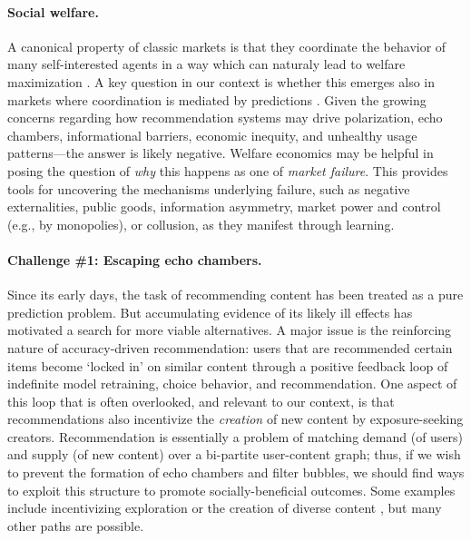 \paragraph{Social welfare.}
A canonical property of classic markets is that they coordinate the behavior of many self-interested agents in a way which can naturaly lead to welfare maximization \citep[e.g.,][]{arrow1954existence,shapley1971assignment}.
A key question in our context is whether this emerges also in 
markets where coordination is mediated by predictions
\citep{nahum2024decongestion}.
Given the growing concerns regarding how recommendation systems 
may drive polarization, echo chambers, informational barriers, economic inequity, and unhealthy usage patterns---the answer is likely negative.
Welfare economics may be helpful in posing the question of \emph{why} 
this happens as one of \emph{market failure}.
This provides tools for uncovering the mechanisms underlying failure,
such as negative externalities,
public goods,
information asymmetry,%
market power and control (e.g., by monopolies),
or collusion,
as they manifest through learning.%
\squeeze 


\paragraph{Challenge \#1: Escaping echo chambers.}
Since its early days, %
the task of recommending content has been treated as a pure prediction problem.
But accumulating evidence of its likely ill effects
has motivated a search for more viable alternatives.
A major issue is the reinforcing nature of accuracy-driven recommendation:
users that are recommended certain items become `locked in' on similar content
through a positive feedback loop of indefinite
model retraining, choice behavior, and recommendation.
One aspect of this loop that is often overlooked, and relevant to our context,
is that recommendations also incentivize the \emph{creation} of new content
by exposure-seeking creators.
Recommendation is essentially a problem of matching
demand (of users) and supply (of new content) over a bi-partite user-content graph;
thus, if we wish to prevent the formation of echo chambers and filter bubbles,
we should find ways to exploit this structure to promote socially-beneficial outcomes.
Some examples include incentivizing exploration \citep{mansour2020bayesian}
or the creation of diverse content \citep{eilat2023performative,yao2024user},
but many other paths are possible.
\squeeze


